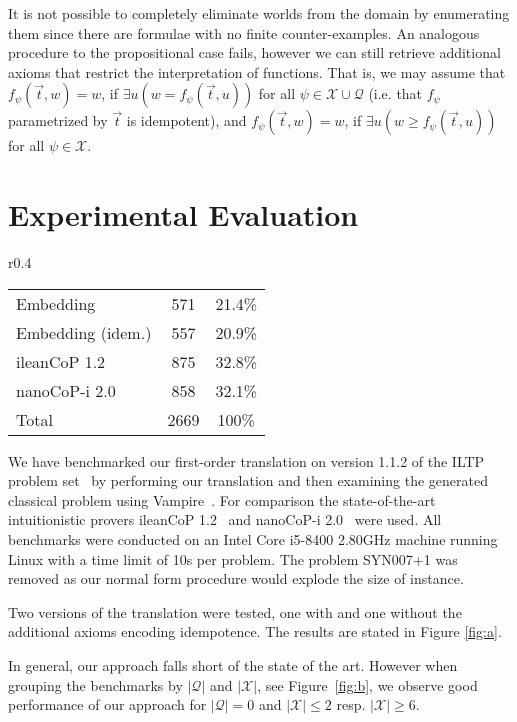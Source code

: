 \documentclass{easychair}
\theoremstyle{definition}
\theoremstyle{definition}
\theoremstyle{definition}
\theoremstyle{definition}
\theoremstyle{definition}
\theoremstyle{definition}
\theoremstyle{definition}
\begin{document}
It is not possible to completely eliminate worlds from the domain by enumerating them since there are formulae with no finite counter-examples. An analogous procedure to the propositional case fails, however we can still retrieve additional axioms that restrict the interpretation of functions. That is, we may assume that $f_\psi(\vec t, w) = w$, if $\exists u(w = f_\psi(\vec t, u))$ for all $\psi\in\mathcal X\cup\mathcal Q$ (i.e. that $f_\psi$ parametrized by $\vec t$ is idempotent), and $f_\psi(\vec t, w) = w$, if $\exists u(w \geq f_\psi(\vec t, u))$ for all $\psi\in\mathcal X$.

\section{Experimental Evaluation}
\label{sec:evaluation}

\begin{wrapfigure}[5]{r}{0.4\textwidth}
	\vspace*{-1.6cm}
	\begin{tabular}{l|c|c}
		Embedding&571&21.4\%\\
		Embedding (idem.)&557&20.9\%\\
		ileanCoP 1.2&875&32.8\%\\
		nanoCoP-i 2.0&858&32.1\%\\\hline
		Total&2669&100\%
	\end{tabular}
	\caption{Solved problems.}
	\label{fig:a}
\end{wrapfigure}

We have benchmarked our first-order translation on version 1.1.2 of the ILTP problem set~\cite{iltp} by performing our translation and then examining the generated classical problem using Vampire~\cite{kovacs2013first}.
For comparison the state-of-the-art intuitionistic provers ileanCoP 1.2~\cite{otten2008leancop} and nanoCoP-i 2.0~\cite{otten2021nanocop} were used. All benchmarks were conducted on an Intel Core i5-8400 2.80GHz machine running Linux with a time limit of 10s per problem. The problem \textsc{SYN007+1} was removed as our normal form procedure would explode the size of instance.

Two versions of the translation were tested, one with and one without the additional axioms encoding idempotence. The results are stated in Figure \ref{fig:a}.

In general, our approach falls short of the state of the art. 
However when grouping the benchmarks by $|\mathcal Q|$ and $|\mathcal X|$, see Figure~\ref{fig:b},
we observe good performance of our approach for $|\mathcal Q| = 0$ and $|\mathcal X| \leq 2$ resp. $|\mathcal X| \geq 6$.
\end{document}
